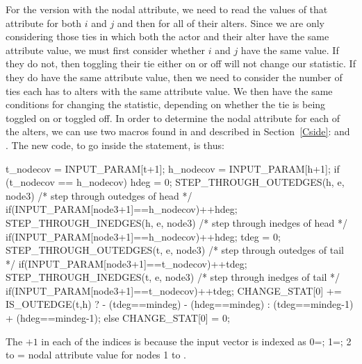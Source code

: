 \documentclass[nojss]{jss}
\begin{document}
For the version with the nodal attribute, we need to read the values of that attribute for both $i$ and $j$ and then for all of their alters.  Since we are only considering those ties in which both the actor and their alter have the same attribute value, we must first consider whether $i$ and $j$ have the same value.  If they do not, then toggling their tie either on or off will not change our statistic. If they do have the same attribute value, then we need to consider the number of ties each has to alters with the same attribute value. We then have the same conditions for changing the statistic, depending on whether the tie is being toggled on or toggled off. In order to determine the nodal attribute for each of the alters, we can use two macros found in  and described in Section~\ref{Cside}:  and . The new code, to go inside the  statement, is thus:
\begin{CodeChunk}
\begin{CodeInput}
      t_nodecov = INPUT_PARAM[t+1];
      h_nodecov = INPUT_PARAM[h+1];
      if (t_nodecov == h_nodecov) {
        hdeg = 0;
        STEP_THROUGH_OUTEDGES(h, e, node3) { /* step through outedges of head */
          if(INPUT_PARAM[node3+1]==h_nodecov){++hdeg;}
        }
        STEP_THROUGH_INEDGES(h, e, node3) { /* step through inedges of head */
          if(INPUT_PARAM[node3+1]==h_nodecov){++hdeg;}
        }
        tdeg = 0;
        STEP_THROUGH_OUTEDGES(t, e, node3) { /* step through outedges of tail */
          if(INPUT_PARAM[node3+1]==t_nodecov){++tdeg;}
        }
        STEP_THROUGH_INEDGES(t, e, node3) { /* step through inedges of tail */
          if(INPUT_PARAM[node3+1]==t_nodecov){++tdeg;}
        }
        CHANGE_STAT[0] += IS_OUTEDGE(t,h) ?
          - (tdeg==mindeg) - (hdeg==mindeg) :
          (tdeg==mindeg-1) + (hdeg==mindeg-1);
      }else{
        CHANGE_STAT[0] = 0;
      }

\end{CodeInput}
\end{CodeChunk}
The $+1$ in each of the  indices is because the input vector
is indexed as 0=; 1=; 2 to  = nodal
attribute value for nodes 1 to .
\end{document}
